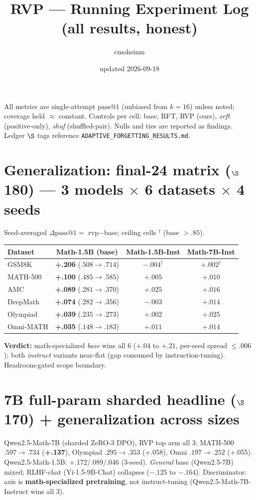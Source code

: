 \documentclass[a4paper,10pt]{article}
\title{RVP --- Running Experiment Log (all results, honest)}
\author{cmohsinm}\date{updated 2026-09-18}
\newcommand{\best}[1]{\textbf{#1}}
\begin{document}
\maketitle
\noindent All metrics are single-attempt $\text{pass}@1$ (unbiased from $k{=}16$) unless noted; coverage held
$\approx$ constant. Controls per cell: base, RFT, RVP (ours), \emph{xrft} (positive-only), \emph{shuf}
(shuffled-pair). Nulls and ties are reported as findings. Ledger $\S$ tags reference
\texttt{ADAPTIVE\_FORGETTING\_RESULTS.md}.

\section{Generalization: final-24 matrix ($\S$180) --- 3 models $\times$ 6 datasets $\times$ 4 seeds}
Seed-averaged $\Delta\text{pass}@1=$ rvp$-$base; ceiling cells $^{\dagger}$ (base ${>}.85$).
\begin{longtable}{lccc}
\toprule
Dataset & Math-1.5B (base) & Math-1.5B-Inst & Math-7B-Inst \\
\midrule
GSM8K     & \best{+.206} ($.508\!\to\!.714$) & $-.004^{\dagger}$ & $+.002^{\dagger}$ \\
MATH-500  & \best{+.100} ($.485\!\to\!.585$) & $+.005$ & $+.010$ \\
AMC       & \best{+.089} ($.281\!\to\!.370$) & $+.025$ & $+.016$ \\
DeepMath  & \best{+.074} ($.282\!\to\!.356$) & $-.003$ & $+.014$ \\
Olympiad  & \best{+.039} ($.235\!\to\!.273$) & $+.002$ & $+.025$ \\
Omni-MATH & \best{+.035} ($.148\!\to\!.183$) & $+.011$ & $+.014$ \\
\bottomrule
\end{longtable}
\textbf{Verdict:} math-specialized \emph{base} wins all 6 ($+.04$ to $+.21$, per-seed spread $\le.006$);
both \emph{instruct} variants near-flat (gap consumed by instruction-tuning). Headroom-gated scope boundary.

\section{7B full-param sharded headline ($\S$170) + generalization across sizes}
Qwen2.5-Math-7B (sharded ZeRO-3 DPO), RVP top arm all 3: MATH-500 $.597\!\to\!.734$ (\best{+.137}),
Olympiad $.295\!\to\!.353$ (+.058), Omni $.197\!\to\!.252$ (+.055). Qwen2.5-Math-1.5B: +.172/.089/.046
(3-seed). \emph{General} base (Qwen2.5-7B) mixed; RLHF-chat (Yi-1.5-9B-Chat) collapses ($-.125$ to $-.164$).
Discriminator: axis is \textbf{math-specialized pretraining}, not instruct-tuning (Qwen2.5-Math-7B-Instruct
wins all 3).
\end{document}
